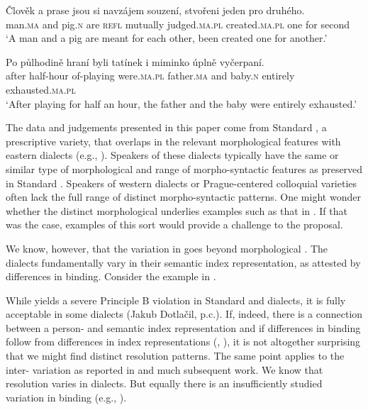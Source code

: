\documentclass[output=paper,modfontsnewtxmath,hidelinks]{langscibook}
\begin{document}
\ea\gll Člověk a prase jsou si navzájem souzení, stvořeni jeden pro druhého.\label{colloq}\\
man.\textsc{ma} and pig.\textsc{n} are \textsc{refl} mutually judged.\textsc{ma.pl} created.\textsc{ma.pl} one for second\\
\glt `A man and a pig are meant for each other, been created one for another.'
\z

\ea\gll Po půlhodině hraní byli tatínek i miminko úplně vyčerpaní.\label{human}\\
after half-hour of-playing were.\textsc{ma.pl} father.\textsc{ma} and baby.\textsc{n} entirely exhausted.\textsc{ma.pl}\\
\glt `After playing for half an hour, the father and the baby were entirely exhausted.'
\z

\noindent The data and judgements presented in this paper come from Standard , a prescriptive variety, that  overlaps in the relevant morphological features with eastern  dialects (e.g., \citealt[401--404]{KarlikEtAl:2002}). Speakers of these dialects typically have the same or similar type of morphological  and range of morpho-syntactic features as preserved in Standard . Speakers of western dialects or Prague-centered colloquial varieties often lack the full range of distinct morpho-syntactic patterns. One might wonder whether the distinct morphological  underlies examples such as that in . If that was the case, examples of this sort would provide a challenge to the  proposal.

We know, however, that the variation in  goes beyond morphological . The dialects fundamentally vary in their semantic index representation, as attested by differences in binding. Consider the example in .

\z

\noindent While  yields a severe Principle B violation in Standard  and  dialects, it is fully acceptable in some  dialects (Jakub Dotlačil, p.c.). If, indeed, there is a connection between a person- and semantic index representation and if differences in binding follow from differences in index representations (\citealt{Heim1998}, \citealt{Roelofsen2008}), it is not altogether surprising that we might find distinct resolution patterns. The same point applies to the inter- variation as reported in \citet{corbett83} and much subsequent work. We know that  resolution varies in  dialects. But equally there is an insufficiently studied variation in binding (e.g., \citealt{Nikolaeva2014}). 
\end{document}
